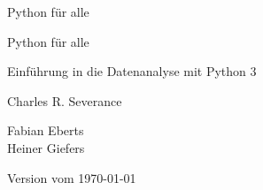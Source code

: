 
\begin{titlepage}
\begin{center}
\vspace*{25mm}

\sffamily
\LARGE
Python für alle

\end{center}
\end{titlepage}


\begin{titlepage}
\begin{center}
\vspace*{25mm}

\sffamily
\LARGE
Python für alle

\large
Einführung in die Datenanalyse mit Python 3

\vspace{15mm}

\large
Charles R. Severance

\vspace{25mm}

\normalsize
Fabian Eberts\\
Heiner Giefers

\vspace{10cm}

\normalsize
Version vom \today

\end{center}
\end{titlepage}

\normalsize
\normalfont
